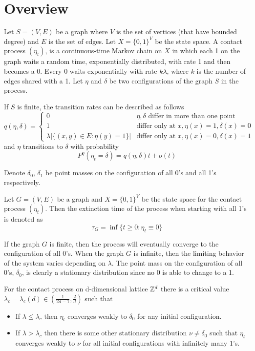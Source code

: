 
\section{Overview}
\begin{defn}
Let $S = (V,E)$ be a graph where $V$ is the set of vertices (that have bounded degree) and $E$ is the set of edges.
Let $X =  \{0,1\}^V$ be the state space.
A contact process $(\eta_t)$, is a continuous-time Markov chain on $X$ in which each 1 on the graph waits a random time, exponentially distributed, with rate 1 and then becomes a 0.
Every 0 waits exponentially with rate $k \lambda$, where $k$ is the number of edges shared with a 1.
Let $\eta$ and $\delta$ be two configurations of the graph $S$ in the process.

If $S$ is finite, the transition rates can be described as follows
$$
q(\eta, \delta) = \begin{cases}
    0 & \eta, \delta \text{ differ in more than one point}\\
    1 & \text{differ only at } x, \eta(x) = 1, \delta(x) = 0\\
    \lambda |\{ (x,y) \in E : \eta(y) = 1\}| & \text{differ only at } x, \eta(x) = 0, \delta(x) = 1
\end{cases}
$$
and $\eta$ transitions to $\delta$ with probability
$$
P^\eta(\eta_t = \delta) = q(\eta, \delta) t + o(t)
$$

Denote $\delta_0$, $\delta_1$ be point masses on the configuration of all 0's and all 1's respectively.
\end{defn}

\begin{defn}
Let $G = (V,E)$ be a graph and $X = \{0,1\}^V$ be the state space for the contact process $(\eta_t)$.
Then the extinction time of the process when starting with all 1's is denoted as
$$
\tau_{G} = \inf\{ t \geq 0 : \eta_t \equiv 0 \}
$$
\end{defn}

If the graph $G$ is finite, then the process will eventually converge to the configuration of all 0's.
When the graph $G$ is infinite, then the limiting behavior of the system varies depending on $\lambda$.
The point mass on the configuration of all 0's, $\delta_0$, is clearly a stationary distribution since no 0 is able to change to a 1.

\begin{theorem} \cite{Liggett2002}
For the contact process on d-dimensional lattice $\mathbb{Z}^d$ there is a critical value $\lambda_c = \lambda_c(d) \in \left( \frac{1}{2d - 1}, \frac{2}{d} \right)$ such that
\begin{itemize}
    \item If $\lambda \leq \lambda_c$ then $\eta_t$ converges weakly to $\delta_0$ for any initial configuration.
    \item If $\lambda > \lambda_c$ then there is some other stationary distribution $\nu \not = \delta_0$ such that $\eta_t$ converges weakly to $\nu$ for all initial configurations with infinitely many 1's.
\end{itemize}
\end{theorem}

